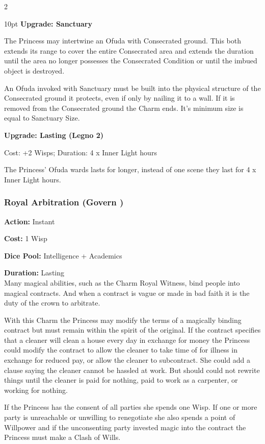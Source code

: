\begin{multicols}{2}
\begin{myindentpar}{10pt}
\textbf{Upgrade: Sanctuary}

The Princess may intertwine an Ofuda with Consecrated ground. This both extends its range to cover the entire Consecrated area and extends the duration until the area no longer possesses the Consecrated Condition or until the imbued object is destroyed.

An Ofuda invoked with Sanctuary must be built into the physical structure of the Consecrated ground it protects, even if only by nailing it to a wall. If it is removed from the Consecrated ground the Charm ends. It's minimum size is equal to Sanctuary Size.

\textbf{Upgrade: Lasting (Legno 2)}

Cost: +2 Wisps; Duration: 4 x Inner Light hours

The Princess' Ofuda wards lasts for longer, instead of one scene they last for 4 x Inner Light hours.\end{myindentpar}

\subsubsection*{Royal Arbitration (Govern \textbullet\textbullet\textbullet)}

\noindent \textbf{Action:} Instant 

\noindent \textbf{Cost:} 1 Wisp

\noindent \textbf{Dice Pool:} Intelligence + Academics

\noindent \textbf{Duration:} Lasting \\

Many magical abilities, such as the Charm Royal Witness, bind people into magical contracts. And when a contract is vague or made in bad faith it is the duty of the crown to arbitrate. 

With this Charm the Princess may modify the terms of a magically binding contract but must remain within the spirit of the original. If the contract specifies that a cleaner will clean a house every day in exchange for money the Princess could modify the contract to allow the cleaner to take time of for illness in exchange for reduced pay, or allow the cleaner to subcontract. She could add a clause saying the cleaner cannot be hassled at work. But should could not rewrite things until the cleaner is paid for nothing, paid to work as a carpenter, or working for nothing.

If the Princess has the consent of all parties she spends one Wisp. If one or more party is unreachable or unwilling to renegotiate she also spends a point of Willpower and if the unconsenting party invested magic into the contract the Princess must make a Clash of Wills. 


\end{multicols}
